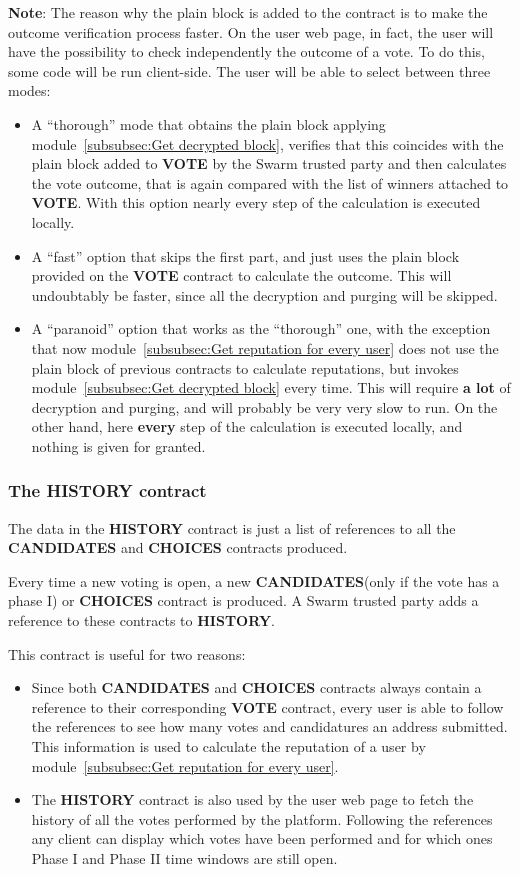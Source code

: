 \documentclass[submission, copyright,creativecommons,sharealike,noncommercial]{eptcs}
\newcommand{\Candidates}{\textbf{CANDIDATES}\xspace}
\newcommand{\Choices}{\textbf{CHOICES}\xspace}
\newcommand{\Vote}{\textbf{VOTE}\xspace}
\newcommand{\History}{\textbf{HISTORY}\xspace}
\begin{document}
	\textbf{Note}: The reason why the plain block is added to the contract is to make the outcome verification process faster. On the user web page, in fact, the user will have the possibility to check independently the outcome of a vote. To do this, some code will be run client-side. The user will be able to select between three modes:
	\begin{itemize}
		\item A ``thorough'' mode that obtains the plain block applying module~\ref{subsubsec:Get decrypted block}, verifies that this coincides with the plain block added to \Vote by the Swarm trusted party and then calculates the vote outcome, that is again compared with the list of winners attached to \Vote. With this option nearly every step of the calculation is executed locally.
		
		\item A ``fast'' option that skips the first part, and just uses the plain block provided on the \Vote contract to calculate the outcome. This will undoubtably be faster, since all the decryption and purging will be skipped.
		
		\item A ``paranoid'' option that works as the ``thorough'' one, with the exception that now module~\ref{subsubsec:Get reputation for every user} does not use the plain block of previous contracts to calculate reputations, but invokes module~\ref{subsubsec:Get decrypted block} every time. This will require \textbf{a lot} of decryption and purging, and will probably be very very slow to run. On the other hand, here \textbf{every} step of the calculation is executed locally, and nothing is given for granted.
	\end{itemize} 
%
%
\subsubsection{The \History contract}\label{subsubsec:The reputation contract}
	The data in the \History contract is just a list of references to all the \Candidates and \Choices contracts produced. 
	
	Every time a new voting is open, a new \Candidates (only if the vote has a phase I) or \Choices contract is produced. A Swarm trusted party adds a reference to these contracts to \History. 
	
	This contract is useful for two reasons:
	\begin{itemize}
		\item Since both \Candidates and \Choices contracts always contain a reference to their corresponding \Vote contract, every user is able to follow the references to see how many votes and candidatures an address submitted. This information is used to calculate the reputation of a user by module~\ref{subsubsec:Get reputation for every user}.
		
		\item The \History contract is also used by the user web page to fetch the history of all the votes performed by the platform. Following the references any client can display which votes have been performed and for which ones Phase I and Phase II time windows are still open.
	\end{itemize}
%
%	
\end{document}
